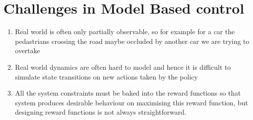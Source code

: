 \documentclass[11pt]{article}
\begin{document}
\section{Challenges in Model Based control}
\begin{enumerate}
\item Real world is often only partially observable, so for example for a car the pedastrians crossing the road maybe occluded by another car we are trying to overtake
\item Real world dynamics are often hard to model and hence it is difficult to simulate state transitions on new actions taken by the policy
\item All the system constraints must be baked into the reward functions so that system produces desirable behaviour on maximising this reward function, but designing reward functions is not always straightforward.
\end{enumerate}




{


}


\end{document}
